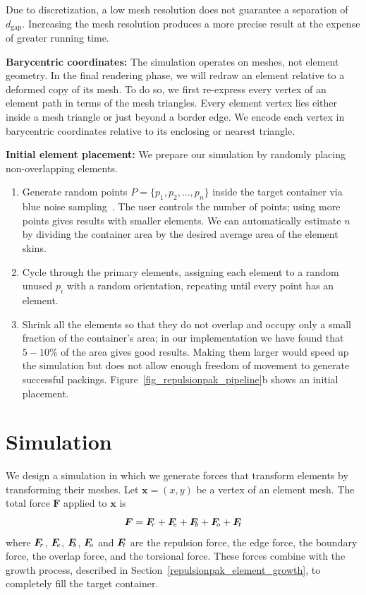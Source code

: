 Due to discretization, a low mesh resolution does not guarantee a separation of $d_\mathrm{gap}$. 
Increasing the mesh resolution produces a more precise result at the expense of greater running time.

\textbf{Barycentric coordinates:}
The simulation operates on meshes, not element geometry.  In the final
rendering phase, we will redraw an element relative to a deformed copy of
its mesh.  To do so, we first re-express every vertex of an element path in 
terms of the mesh triangles.  Every element vertex lies either inside a mesh
triangle or just beyond a border edge.  We encode each vertex in barycentric
coordinates relative to its enclosing or nearest triangle.

\textbf{Initial element placement:}
We prepare our simulation by randomly placing non-overlapping elements.
\begin{enumerate}
	\item Generate random points $P = \{ p_1, p_2,..., p_n \}$ 
		  inside the target container 
	      via blue noise sampling~\cite{Bridson2007}.
	      The user controls the number of points; using more points gives results
	      with smaller elements.  We can automatically estimate $n$ by
		  dividing the container area by the desired average area of the element skins.
	\item Cycle through the primary elements, assigning each element to a 
		  random unused $p_i$ with a random orientation, repeating until 
		  every point has an element.
	\item Shrink all the elements so that they do not overlap and occupy only
		  a small fraction of the container's area; in our implementation we
		  have found that $5-10$\% of the area gives good results. Making them
		  larger would speed up the simulation but does
	      not allow enough freedom of movement to generate successful
		  packings.  Figure~\ref{fig_repulsionpak_pipeline}b shows an initial placement.	      
\end{enumerate}


\section{Simulation}
\label{repulsionpak_simulation}

\newtext
{
We design a simulation in which we generate 
forces that transform elements by transforming their meshes.
Let $\bm{x} = (x, y)$ be a vertex of an element mesh. 
The total force $\bm{F}$ applied to $\bm{x}$ is
\begin{equation}
\bm{F} = \simforce{r} + \simforce{e} + \simforce{b} + \simforce{o} + \simforce{t}
\end{equation}
where $\simforce{r}$, $\simforce{e}$, $\simforce{b}$, $\simforce{o}$ and $\simforce{t}$ are 
the repulsion force, the edge force, the boundary force, the overlap force, and the torsional force.
These forces combine with the growth process, described in
Section~\ref{repulsionpak_element_growth}, to completely fill the target container.
}

